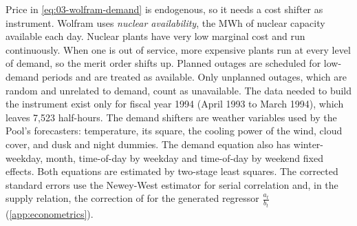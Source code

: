 Price in \eqref{eq:03-wolfram-demand} is endogenous, so it needs a cost shifter as instrument. Wolfram uses
\emph{nuclear availability}, the MWh of nuclear capacity available each day. Nuclear plants have very low marginal cost
and run continuously. When one is out of service, more expensive plants run at every level of demand, so the merit order
shifts up. Planned outages are scheduled for low-demand periods and are treated as available. Only unplanned outages,
which are random and unrelated to demand, count as unavailable. The data needed to build the instrument exist only for
fiscal year 1994 (April 1993 to March 1994), which leaves 7,523 half-hours. The demand shifters are weather variables
used by the Pool's forecasters: temperature, its square, the cooling power of the wind, cloud cover, and dusk and night
dummies. The demand equation also has winter-weekday, month, time-of-day by weekday and time-of-day by weekend fixed
effects. Both equations are estimated by two-stage least squares. The corrected standard errors use the Newey-West
estimator for serial correlation and, in the supply relation, the correction of \citet{Newey1984} for the generated
regressor $\frac{a_t}{b_t}$ (\cref{app:econometrics}).

